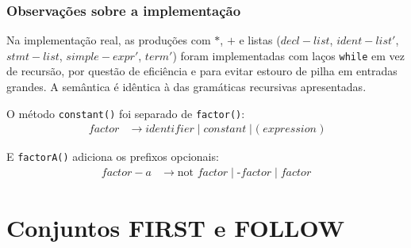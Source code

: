 \documentclass[12pt,a4paper]{article}
\begin{document}
\subsubsection{Observações sobre a implementação}

\normalfont\normalsize

Na implementação real, as produções com $*$, $+$ e listas ($decl\!-\!list$, $ident\!-\!list'$,
$stmt\!-\!list$, $simple\!-\!expr'$, $term'$) foram implementadas com laços \texttt{while} em vez de recursão, por
questão de eficiência e para evitar estouro de pilha em entradas grandes. A semântica é
idêntica à das gramáticas recursivas apresentadas.

O método \texttt{constant()} foi separado de \texttt{factor()}:
\begin{align*}
factor          &\to identifier \mid constant \mid \text{(} \; expression \; \text{)}
\end{align*}


E \texttt{factorA()} adiciona os prefixos opcionais:
\begin{align*}
factor\!-\!a    &\to \text{not } factor \mid \text{-} factor \mid factor
\end{align*}

\section{Conjuntos FIRST e FOLLOW}
\end{document}
